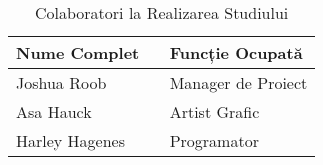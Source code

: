 \begin{table}[h]
    \begin{tabular}{ | p{0.5\linewidth} | p{0.5\linewidth} | }
        \hline
        Nume Complet & Funcție Ocupată \\
        \hline
        Joshua Roob & Manager de Proiect \\
        Asa Hauck & Artist Grafic \\
        Harley Hagenes & Programator \\
        \hline
    \end{tabular}
    \caption{Colaboratori la Realizarea Studiului}
    \label{tab:small_table}
\end{table}
